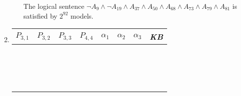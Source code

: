 \begin{enumerate}
\begin{enumerate}
The logical sentence $\neg A_9 \land \neg A_{19} \land A_{37} \land A_{50} \land A_{68} \land A_{73} \land A_{79} \land A_{81}$ is satisfied by $2^{92}$ models.
\end{enumerate}
\item
\begin{tabular}{cccc|ccc|c}
$P_{3,1}$ & $P_{3,2}$ & $P_{3,3}$ & $P_{4,4}$ & $\alpha_1$ & $\alpha_2$ & $\alpha_3$ & \textit{KB} \\
\hline
\F        & \F        & \F        & \F        & \F         & \F         & \F         & \F          \\
\F        & \F        & \F        & \T        & \F         & \F         & \T         & \F          \\
\F        & \F        & \T        & \F        & \F         & \T         & \T         & \F          \\
\F        & \F        & \T        & \T        & \F         & \T         & \T         & \F          \\
\F        & \T        & \F        & \F        & \F         & \F         & \F         & \F          \\
\F        & \T        & \F        & \T        & \F         & \F         & \T         & \F          \\
\F        & \T        & \T        & \F        & \F         & \T         & \T         & \F          \\
\F        & \T        & \T        & \T        & \F         & \T         & \T         & \F          \\
\T        & \F        & \F        & \F        & \T         & \F         & \F         & \F          \\
\T        & \F        & \F        & \T        & \T         & \F         & \T         & \T          \\
\T        & \F        & \T        & \F        & \T         & \T         & \T         & \T          \\
\T        & \F        & \T        & \T        & \T         & \T         & \T         & \T          \\
\T        & \T        & \F        & \F        & \T         & \F         & \F         & \F          \\
\T        & \T        & \F        & \T        & \T         & \F         & \T         & \F          \\
\T        & \T        & \T        & \F        & \T         & \T         & \T         & \F          \\
\T        & \T        & \T        & \T        & \T         & \T         & \T         & \F          \\
\end{tabular}


\end{enumerate}
